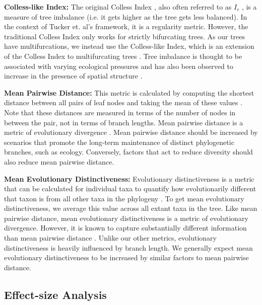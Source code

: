 \textbf{Colless-like Index:}
The original Colless Index \citep{collessReviewPhylogeneticsTheory1982}, also often referred to as $I_c$ \citep{shaoTreeBalance1990}, is a measure of tree imbalance (i.e. it gets higher as the tree gets less balanced).
In the context of Tucker et.
al's framework, it is a regularity metric.
However, the traditional Colless Index only works for strictly bifurcating trees.
As our trees have multifurcations, we instead use the Colless-like Index, which is an extension of the Colless Index to multifurcating trees \citep{mirSoundCollesslikeBalance2018}.
Tree imbalance is thought to be associated with varying ecological pressures \citep{chamberlainPhylogeneticTreeShape2014, burressEcologicalOpportunityAlters} and has also been observed to increase in the presence of spatial structure \citep{scottInferringTumorProliferative2020}.

\textbf{Mean Pairwise Distance:}
This metric is calculated by computing the shortest distance between all pairs of leaf nodes and taking the mean of these values \citep{webbExploringPhylogeneticStructure2000}.
Note that these distances are measured in terms of the number of nodes in between the pair, not in terms of branch lengths.
Mean pairwise distance is a metric of evolutionary divergence \citep{tuckerGuidePhylogeneticMetrics2017}.
Mean pairwise distance should be increased by scenarios that promote the long-term maintenance of distinct phylogenetic branches, such as ecology.
Conversely, factors that act to reduce diversity should also reduce mean pairwise distance.

\textbf{Mean Evolutionary Distinctiveness:}
Evolutionary distinctiveness is a metric that can be calculated for individual taxa to quantify how evolutionarily different that taxon is from all other taxa in the phylogeny \citep{isaacMammalsEDGEConservation2007}.
To get mean evolutionary distinctiveness, we average this value across all extant taxa in the tree.
Like mean pairwise distance, mean evolutionary distinctiveness is a metric of evolutionary divergence.
However, it is known to capture substantially different information than mean pairwise distance \citep{tuckerGuidePhylogeneticMetrics2017}.
Unlike our other metrics, evolutionary distinctiveness is heavily influenced by branch length.
We generally expect mean evolutionary distinctiveness to be increased by similar factors to mean pairwise distance.

\subsection{Effect-size Analysis}

